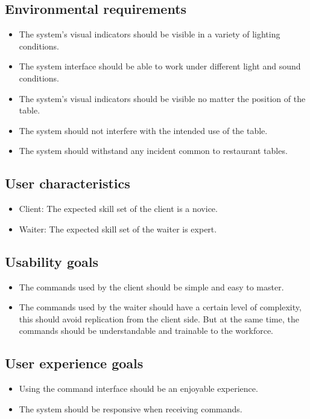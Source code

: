 \documentclass{article}
\begin{document}
\subsection{Environmental requirements}
\begin{itemize}
    \item The system's visual indicators should be visible in a variety of lighting conditions.
    \item The system interface should be able to work under different light and sound conditions.
    \item The system's visual indicators should be visible no matter the position of the table.
    \item The system should not interfere with the intended use of the table.
    \item The system should withstand any incident common to restaurant tables.
\end{itemize}
\subsection{User characteristics}
\begin{itemize}
    \item Client: The expected skill set of the client is a novice.
    \item Waiter: The expected skill set of the waiter is expert.
\end{itemize}
\subsection{Usability goals}
\begin{itemize}
    \item The commands used by the client should be simple and easy to master.
    \item The commands used by the waiter should have a certain level of complexity, this should avoid replication from the client side. But at the same time, the commands should be understandable and trainable to the workforce.
\end{itemize}
\subsection{User experience goals}
\begin{itemize}
    \item Using the command interface should be an enjoyable experience.
    \item The system should be responsive when receiving commands.
\end{itemize}
\end{document}
